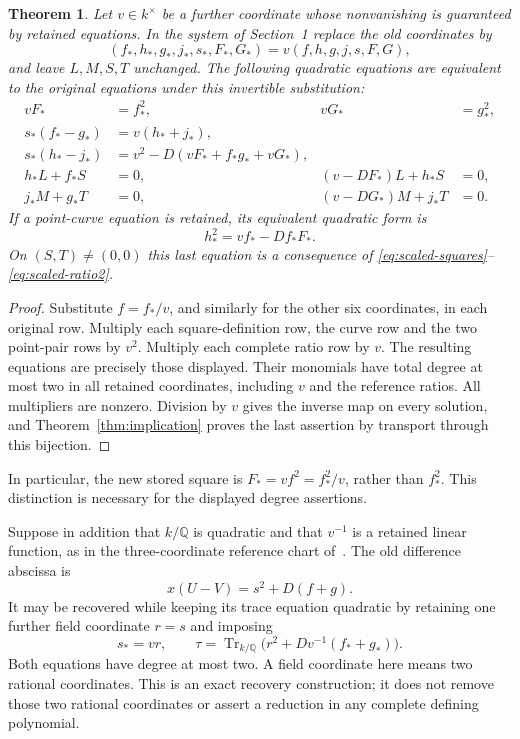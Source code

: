\documentclass[11pt,a4paper]{article}
\newtheorem{theorem}{Theorem}[section]
\theoremstyle{remark}\newtheorem{remark}[theorem]{Remark}
\newcommand{\Q}{\mathbb Q}\newcommand{\Z}{\mathbb Z}
\begin{document}
\begin{theorem}\label{thm:scaling}
Let $v\in k^\times$ be a further coordinate whose nonvanishing is
guaranteed by retained equations. In the system of Section~1 replace
the old coordinates by
\[
 (f_*,h_*,g_*,j_*,s_*,F_*,G_*)
       =v(f,h,g,j,s,F,G),
\]
and leave $L,M,S,T$ unchanged. The following quadratic equations are
equivalent to the original equations under this invertible substitution:
\begin{align}
 vF_*&=f_*^2,&vG_*&=g_*^2,\label{eq:scaled-squares}\\
 s_*(f_*-g_*)&=v(h_*+j_*),\label{eq:scaled-secant}\\
 s_*(h_*-j_*)&=v^2-D(vF_*+f_*g_*+vG_*),\label{eq:scaled-tangent}\\
 h_*L+f_*S&=0,&(v-DF_*)L+h_*S&=0,\label{eq:scaled-ratio1}\\
 j_*M+g_*T&=0,&(v-DG_*)M+j_*T&=0.\label{eq:scaled-ratio2}
\end{align}
If a point-curve equation is retained, its equivalent quadratic form is
\begin{equation}\label{eq:scaled-curve}
                         h_*^2=vf_*-Df_*F_*.
\end{equation}
On $(S,T)\ne(0,0)$ this last equation is a consequence of
\eqref{eq:scaled-squares}--\eqref{eq:scaled-ratio2}.
\end{theorem}
\begin{proof}
Substitute $f=f_*/v$, and similarly for the other six coordinates,
in each original row. Multiply each square-definition row, the curve
row and the two point-pair rows by $v^2$. Multiply each complete
ratio row by $v$. The resulting equations are precisely those
displayed. Their monomials have total degree at most two in all
retained coordinates, including $v$ and the reference ratios.
All multipliers are nonzero. Division by $v$ gives the inverse map
on every solution, and Theorem~\ref{thm:implication} proves the last
assertion by transport through this bijection.
\end{proof}

In particular, the new stored square is
$F_*=vf^2=f_*^2/v$, rather than $f_*^2$.
This distinction is necessary for the displayed degree assertions.

Suppose in addition that $k/\Q$ is quadratic and that $v^{-1}$ is a
retained linear function, as in the three-coordinate reference chart
of~\cite{Three}. The old difference abscissa is
\[
                    x(U-V)=s^2+D(f+g).
\]
It may be recovered while keeping its trace equation quadratic by
retaining one further field coordinate $r=s$ and imposing
\[
 s_*=vr,\qquad
 \tau=\operatorname{Tr}_{k/\Q}
                 \bigl(r^2+Dv^{-1}(f_*+g_*)\bigr).
\]
Both equations have degree at most two. A field coordinate here means
two rational coordinates. This is an exact recovery construction;
it does not remove those two rational coordinates or assert a reduction
in any complete defining polynomial.
\end{document}
